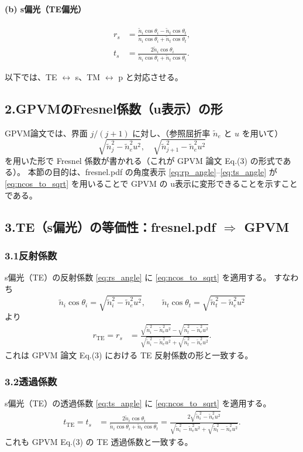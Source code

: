 \paragraph{(b) s偏光（TE偏光）}
\begin{align}
r_s
&=\frac{\tilde n_i\cos\theta_i-\tilde n_t\cos\theta_t}
{\tilde n_i\cos\theta_i+\tilde n_t\cos\theta_t},
\label{eq:rs_angle}
\\
t_s
&=\frac{2\tilde n_i\cos\theta_i}
{\tilde n_i\cos\theta_i+\tilde n_t\cos\theta_t}.
\label{eq:ts_angle}
\end{align}

以下では、TE $\leftrightarrow$ s、TM $\leftrightarrow$ p と対応させる。

\subsection*{2.\;GPVMのFresnel係数（u表示）の形}
GPVM論文では、界面 $j/(j+1)$ に対し、（参照屈折率 $\tilde n_e$ と $u$ を用いて）
\[
\sqrt{\tilde n_j^2-\tilde n_e^2u^2},\quad
\sqrt{\tilde n_{j+1}^2-\tilde n_e^2u^2}
\]
を用いた形で Fresnel 係数が書かれる（これが GPVM 論文 Eq.(3) の形式である）。
本節の目的は、fresnel.pdf の角度表示 \eqref{eq:rp_angle}--\eqref{eq:ts_angle} が
\eqref{eq:ncos_to_sqrt} を用いることで GPVM の u表示に変形できることを示すことである。

\subsection*{3.\;TE（s偏光）の等価性：fresnel.pdf $\Rightarrow$ GPVM}
\subsubsection*{3.1\;反射係数}
s偏光（TE）の反射係数 \eqref{eq:rs_angle} に \eqref{eq:ncos_to_sqrt} を適用する。
すなわち
\[
\tilde n_i\cos\theta_i=\sqrt{\tilde n_i^2-\tilde n_e^2u^2},
\qquad
\tilde n_t\cos\theta_t=\sqrt{\tilde n_t^2-\tilde n_e^2u^2}
\]
より
\begin{align}
r_{\mathrm{TE}}
=r_s
&=\frac{\sqrt{\tilde n_i^2-\tilde n_e^2u^2}-\sqrt{\tilde n_t^2-\tilde n_e^2u^2}}
{\sqrt{\tilde n_i^2-\tilde n_e^2u^2}+\sqrt{\tilde n_t^2-\tilde n_e^2u^2}}.
\label{eq:rTE_u}
\end{align}
これは GPVM 論文 Eq.(3) における TE 反射係数の形と一致する。

\subsubsection*{3.2\;透過係数}
s偏光（TE）の透過係数 \eqref{eq:ts_angle} に \eqref{eq:ncos_to_sqrt} を適用する。
\begin{align}
t_{\mathrm{TE}}
=t_s
&=\frac{2\tilde n_i\cos\theta_i}{\tilde n_i\cos\theta_i+\tilde n_t\cos\theta_t}
=\frac{2\sqrt{\tilde n_i^2-\tilde n_e^2u^2}}
{\sqrt{\tilde n_i^2-\tilde n_e^2u^2}+\sqrt{\tilde n_t^2-\tilde n_e^2u^2}}.
\label{eq:tTE_u}
\end{align}
これも GPVM Eq.(3) の TE 透過係数と一致する。

